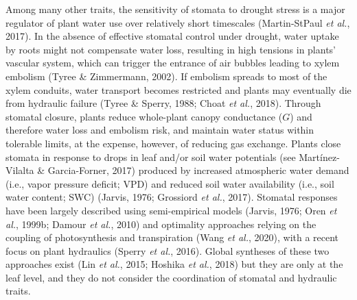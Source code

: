 \documentclass[11pt,twoside]{reedthesis}
\begin{document}
Among many other traits, the sensitivity of stomata to drought stress is
a major regulator of plant water use over relatively short timescales
(Martin-StPaul \emph{et al.}, 2017). In the absence of effective
stomatal control under drought, water uptake by roots might not
compensate water loss, resulting in high tensions in plants' vascular
system, which can trigger the entrance of air bubbles leading to xylem
embolism (Tyree \& Zimmermann, 2002). If embolism spreads to most of the
xylem conduits, water transport becomes restricted and plants may
eventually die from hydraulic failure (Tyree \& Sperry, 1988; Choat
\emph{et al.}, 2018). Through stomatal closure, plants reduce
whole-plant canopy conductance (\(G\)) and therefore water loss and
embolism risk, and maintain water status within tolerable limits, at the
expense, however, of reducing gas exchange. Plants close stomata in
response to drops in leaf and/or soil water potentials (see
Martínez-Vilalta \& Garcia-Forner, 2017) produced by increased
atmospheric water demand (i.e., vapor pressure deficit; VPD) and reduced
soil water availability (i.e., soil water content; SWC) (Jarvis, 1976;
Grossiord \emph{et al.}, 2017). Stomatal responses have been largely
described using semi-empirical models (Jarvis, 1976; Oren \emph{et al.},
1999b; Damour \emph{et al.}, 2010) and optimality approaches relying on
the coupling of photosynthesis and transpiration (Wang \emph{et al.},
2020), with a recent focus on plant hydraulics (Sperry \emph{et al.},
2016). Global syntheses of these two approaches exist (Lin \emph{et
al.}, 2015; Hoshika \emph{et al.}, 2018) but they are only at the leaf
level, and they do not consider the coordination of stomatal and
hydraulic traits.\par 
\end{document}
